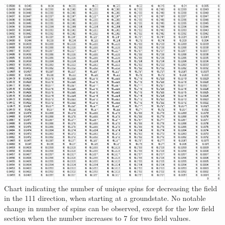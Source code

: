 \documentclass{article}
\begin{document}
\begin{figure}[ht]
\centering
 \includegraphics[keepaspectratio,scale=0.7]{111_3000/005to000SpinChart.png}
 \caption{Chart indicating the number of unique spins for decreasing the field in the 111 direction, when
 starting at a groundstate. No notable change in number of spins can be observed, except for the low field section
 when the number increases to 7 for two field values.}
\end{figure}

\clearpage
\end{document}
